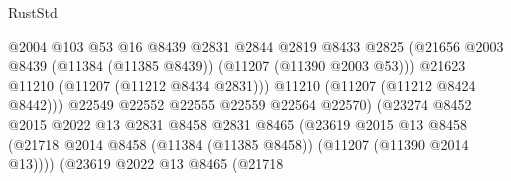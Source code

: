 \begin{lexlean}{RustStd}
\begin{coremodule}
                                              @2004
                                              @103
                                              @53
                                              @16
                                              @8439
                                              @2831
                                              @2844
                                              @2819
                                              @8433
                                              @2825
                                              (@21656
                                                @2003
                                                @8439
                                                (@11384 (@11385 @8439))
                                                (@11207 (@11390 @2003 @53)))
                                              @21623
                                              @11210
                                              (@11207 (@11212 @8434 @2831)))
                                            @11210
                                            (@11207 (@11212 @8424 @8442)))
                                          @22549
                                          @22552
                                          @22555
                                          @22559
                                          @22564
                                          @22570)
                                        (@23274
                                          @8452
                                          @2015
                                          @2022
                                          @13
                                          @2831
                                          @8458
                                          @2831
                                          @8465
                                          (@23619
                                            @2015
                                            @13
                                            @8458
                                            (@21718
                                              @2014
                                              @8458
                                              (@11384 (@11385 @8458))
                                              (@11207 (@11390 @2014 @13))))
                                          (@23619
                                            @2022
                                            @13
                                            @8465
                                            (@21718

\end{coremodule}
\end{lexlean}
